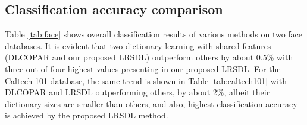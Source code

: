 \documentclass[letterpaper]{article}
\begin{document}
\subsection{Classification accuracy comparison} %
\label{sub:exp}
Table \ref{tab:face} shows overall classification results of various methods on two face databases. It is evident that two dictionary learning with shared features (DLCOPAR\cite{kong2012dictionary} and our proposed LRSDL) outperform others by about 0.5\% with three out of four highest values presenting in our proposed LRSDL. For the Caltech 101 database, the same trend is shown in Table \ref{tab:caltech101} with DLCOPAR\cite{kong2012dictionary} and LRSDL outperforming others, by about 2\%, albeit their dictionary sizes are smaller than others, and also, highest classification accuracy is achieved by the proposed LRSDL method.

\end{document}
